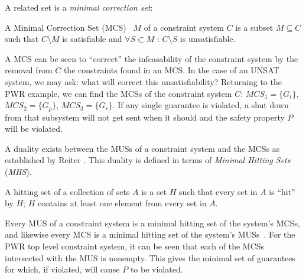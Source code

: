 A related set is a {\em minimal correction set}: 
\begin{definition}
A Minimal Correction Set (MCS)~\cite{reiter1987theory} $M$ of a constraint system $C$ is a subset $M\subseteq C$ such that $C \setminus M$ is satisfiable and $\forall S \subset M$ : $C \setminus S$ is unsatisfiable.
\end{definition}
A MCS can be seen to ``correct'' the infeasability of the constraint system by the removal from $C$ the constraints found in an MCS. In the case of an UNSAT system, we may ask: what will correct this unsatisfiability? Returning to the PWR example, we can find the MCSs of the constraint system $C$: $MCS_1 = \{G_t\}$, $MCS_2 = \{G_p\}$, $MCS_3 = \{G_r\}$. If any single guarantee is violated, a shut down from that subsystem will not get sent when it should and the safety property $P$ will be violated. 

A duality exists between the MUSs of a constraint system and the MCSs as established by Reiter \cite{reiter1987theory}. This duality is defined in terms of \textit{Minimal Hitting Sets} (\textit{MHS}). 

\begin{definition}
A hitting set of a collection of sets $A$ is a set $H$ such that every set in $A$ is ``hit'' by $H$; $H$ contains at least one element from every set in $A$. 
\end{definition}
Every MUS of a constraint system is a minimal hitting set of the system's MCSs, and likewise every MCS is a minimal hitting set of the system's MUSs~\cite{liffiton2016fast, reiter1987theory, de1987diagnosing}. For the PWR top level constraint system, it can be seen that each of the MCSs intersected with the MUS is nonempty. This gives the minimal set of guarantees for which, if violated, will cause $P$ to be violated. 













